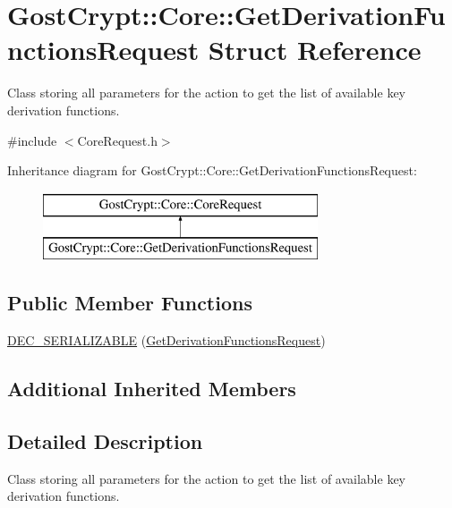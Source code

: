 \hypertarget{struct_gost_crypt_1_1_core_1_1_get_derivation_functions_request}{}\section{Gost\+Crypt\+:\+:Core\+:\+:Get\+Derivation\+Functions\+Request Struct Reference}
\label{struct_gost_crypt_1_1_core_1_1_get_derivation_functions_request}


Class storing all parameters for the action to get the list of available key derivation functions.  




{\ttfamily \#include $<$Core\+Request.\+h$>$}

Inheritance diagram for Gost\+Crypt\+:\+:Core\+:\+:Get\+Derivation\+Functions\+Request\+:\begin{figure}[H]
\begin{center}
\leavevmode
\includegraphics[height=2.000000cm]{struct_gost_crypt_1_1_core_1_1_get_derivation_functions_request}
\end{center}
\end{figure}
\subsection*{Public Member Functions}
\begin{DoxyCompactItemize}
\item 
\hyperlink{struct_gost_crypt_1_1_core_1_1_get_derivation_functions_request_a2929b5578d473aaff27754db5b12e251}{D\+E\+C\+\_\+\+S\+E\+R\+I\+A\+L\+I\+Z\+A\+B\+LE} (\hyperlink{struct_gost_crypt_1_1_core_1_1_get_derivation_functions_request}{Get\+Derivation\+Functions\+Request})
\end{DoxyCompactItemize}
\subsection*{Additional Inherited Members}


\subsection{Detailed Description}
Class storing all parameters for the action to get the list of available key derivation functions. 


